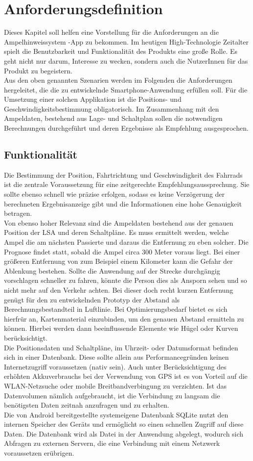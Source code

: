 \chapter{Anforderungsdefinition}
Dieses Kapitel soll helfen eine Vorstellung für die Anforderungen an die Ampelhinweissystem -App zu bekommen. Im heutigen High-Technologie Zeitalter spielt die Benutzbarkeit und Funktionalität des Produkts eine große Rolle. Es geht nicht nur darum, Interesse zu wecken, sondern auch die NutzerInnen für das Produkt zu begeistern. \\
Aus den oben genannten Szenarien werden im Folgenden die Anforderungen hergeleitet, die die zu entwickelnde \gls{Smartphone}-Anwendung erfüllen soll. Für die Umsetzung einer solchen Applikation ist die Positions- und Geschwindigkeitsbestimmung obligatorisch. Im Zusammenhang mit den Ampeldaten, bestehend aus Lage- und Schaltplan sollen die notwendigen Berechnungen durchgeführt und deren Ergebnisse als Empfehlung ausgesprochen.
\section{Funktionalität}
Die Bestimmung der Position, Fahrtrichtung und Geschwindigkeit des Fahrrads ist die zentrale Voraussetzung für eine zeitgerechte Empfehlungsaussprechung. Sie sollte ebenso schnell wie präzise erfolgen, sodass es keine Verzögerung der berechneten Ergebnisanzeige gibt und die Informationen eine hohe Genauigkeit betragen. \\
Von ebenso hoher Relevanz sind die Ampeldaten bestehend aus der genauen Position der \gls{LSA} und deren Schaltpläne. Es muss ermittelt werden, welche Ampel die am nächsten Passierte und daraus die Entfernung zu eben solcher. Die Prognose findet statt, sobald die Ampel circa 300 Meter voraus liegt. Bei einer größeren Entfernung von zum Beispiel einem Kilometer kann die Gefahr der Ablenkung bestehen. Sollte die Anwendung auf der Strecke durchgängig vorschlagen schneller zu fahren, könnte die Person dies als Ansporn sehen und so nicht mehr auf den Verkehr achten. Bei dieser doch recht kurzen Entfernung genügt für den zu entwickelnden Prototyp der Abstand als Berechnungsbestandteil in Luftlinie. Bei Optimierungsbedarf bietet es sich hierfrür an, Kartenmaterial einzubinden, um den genauen Abstand ermitteln zu können. Hierbei werden dann beeinflussende Elemente wie Hügel oder Kurven berücksichtigt.\\
Die Positionsdaten und Schaltpläne, im Uhrzeit- oder Datumsformat befinden sich in einer Datenbank. Diese sollte allein aus Performancegründen keinen Internetzugriff voraussetzen (nativ sein). Auch unter Berücksichtigung des erhöhten Akkuverbrauchs bei der Verwendung von \gls{GPS} ist es von Vorteil auf die \gls{WLAN}-Netzsuche oder mobile Breitbandverbingung zu verzichten. Ist das Datenvolumen nämlich aufgebraucht, ist die Verbindung zu langsam die benötigsten Daten zeitnah anzufragen und zu erhalten.\\ 
Die von Android bereitgestellte systemeigene Datenbank \gls{SQLite} nutzt den internen Speicher des Geräts und ermöglicht so einen schnellen Zugriff auf diese Daten. Die Datenbank wird als Datei in der Anwendung abgelegt, wodurch sich Abfragen zu externen Servern, die eine Verbindung mit einem Netzwerk voraussetzen erübrigen. 
